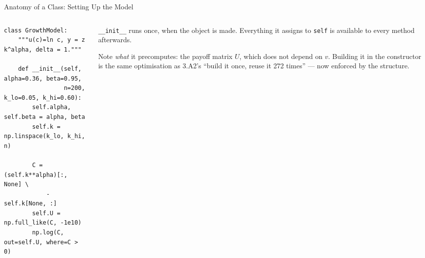 \begin{frame}[fragile]{Anatomy of a Class: Setting Up the Model}
\begin{columns}[T]
\begin{column}{0.56\textwidth}
\begin{lstlisting}
class GrowthModel:
    """u(c)=ln c, y = z k^alpha, delta = 1."""

    def __init__(self, alpha=0.36, beta=0.95,
                 n=200, k_lo=0.05, k_hi=0.60):
        self.alpha, self.beta = alpha, beta
        self.k = np.linspace(k_lo, k_hi, n)

        C = (self.k**alpha)[:, None] \
            - self.k[None, :]
        self.U = np.full_like(C, -1e10)
        np.log(C, out=self.U, where=C > 0)
\end{lstlisting}
\end{column}
\begin{column}{0.41\textwidth}
\small
\texttt{\_\_init\_\_} runs once, when the object is made. Everything it assigns to \texttt{self} is available to every method afterwards.
\medskip
\begin{conceptbox}\footnotesize
Note \emph{what} it precomputes: the payoff matrix $U$, which does not depend on $v$. Building it in the constructor is the same optimisation as 3.A2's ``build it once, reuse it 272 times'' --- now enforced by the structure.
\end{conceptbox}
\end{column}
\end{columns}
\vspace{1mm}
\end{frame}

